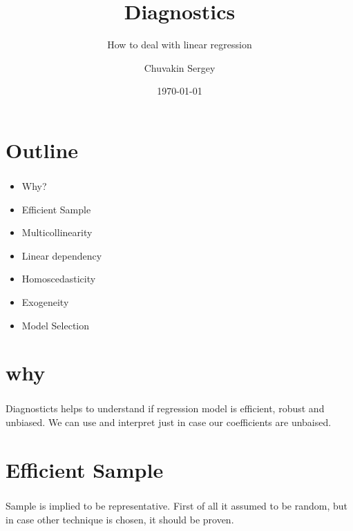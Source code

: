 \documentclass[t, 11pt]{beamer}
\title {Diagnostics}
\subtitle{How to deal with linear regression}
\author{Chuvakin Sergey}
\date{\today}
\institute[<<Anthropology and Sociology major>>]{<<School of Advanced Studies>>}
\begin{document}
	
	
	\frame[plain]{\titlepage}		
	
	\section{Outline}
	
	\begin{frame} 
		\frametitle{\insertsection} 
		\begin{itemize}
			\item Why?
			\item Efficient Sample
			\item Multicollinearity
			\item Linear dependency 
			\item Homoscedasticity
			\item Exogeneity
			\item Model Selection
		\end{itemize}
		
	\end{frame}



\section{why}	
\begin{frame} 
		\frametitle{\insertsection} 
			Diagnosticts helps to understand if regression model is efficient,  robust and unbiased. 
			We can use and interpret just in case our coefficients are unbaised.
		
	\end{frame}
	
\section{Efficient Sample}
\begin{frame} 
	\frametitle{\insertsection} 
		Sample is implied to be representative. First of all it assumed to be random, but in case other technique is chosen, it should be proven. 
	
\end{frame}


\end{document}
